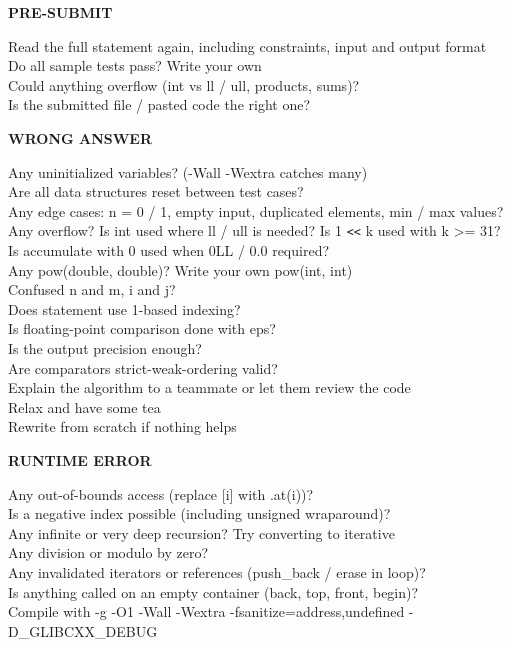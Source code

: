 \textbf{PRE-SUBMIT}

{\normalsize
Read the full statement again, including constraints, input and output format \\
Do all sample tests pass? Write your own \\
Could anything overflow (int vs ll / ull, products, sums)? \\
Is the submitted file / pasted code the right one? \\
\par}

\vspace{-1em}
\textbf{WRONG ANSWER}

{\normalsize
Any uninitialized variables? (-Wall -Wextra catches many) \\
Are all data structures reset between test cases? \\
Any edge cases: n = 0 / 1, empty input, duplicated elements, min / max values? \\
Any overflow? Is int used where ll / ull is needed? Is 1 \verb|<<|   k used with k >= 31? \\
Is accumulate with 0 used when 0LL / 0.0 required? \\
Any pow(double, double)? Write your own pow(int, int) \\
Confused n and m, i and j? \\
Does statement use 1-based indexing? \\
Is floating-point comparison done with eps? \\
Is the output precision enough? \\
Are comparators strict-weak-ordering valid? \\
Explain the algorithm to a teammate or let them review the code \\
Relax and have some tea \\
Rewrite from scratch if nothing helps \\
\par}

\vspace{-1em}
\textbf{RUNTIME ERROR}

{\normalsize
Any out-of-bounds access (replace [i] with .at(i))? \\
Is a negative index possible (including unsigned wraparound)? \\
Any infinite or very deep recursion? Try converting to iterative \\
Any division or modulo by zero? \\
Any invalidated iterators or references (push\_back / erase in loop)? \\
Is anything called on an empty container (back, top, front, begin)? \\
Compile with -g -O1 -Wall -Wextra -fsanitize=address,undefined -D\_GLIBCXX\_DEBUG \\
\par}

